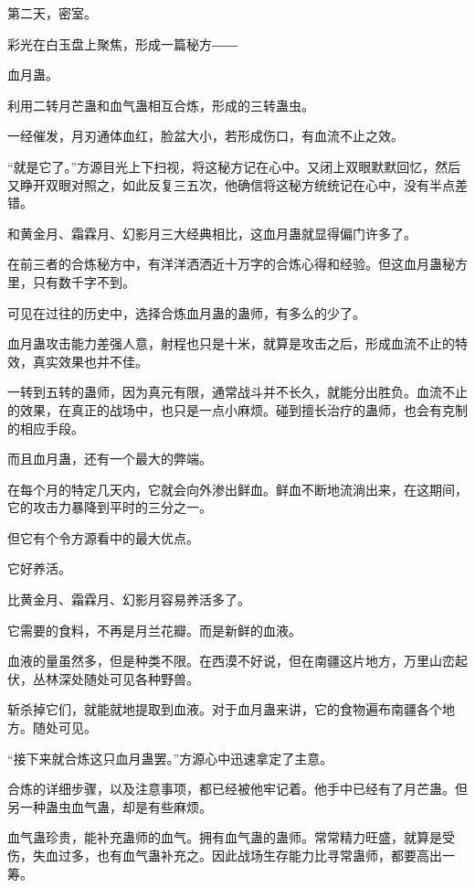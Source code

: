 
\begin{this_body}

第二天，密室。

彩光在白玉盘上聚焦，形成一篇秘方――

血月蛊。

利用二转月芒蛊和血气蛊相互合炼，形成的三转蛊虫。

一经催发，月刃通体血红，脸盆大小，若形成伤口，有血流不止之效。

“就是它了。”方源目光上下扫视，将这秘方记在心中。又闭上双眼默默回忆，然后又睁开双眼对照之，如此反复三五次，他确信将这秘方统统记在心中，没有半点差错。

和黄金月、霜霖月、幻影月三大经典相比，这血月蛊就显得偏门许多了。

在前三者的合炼秘方中，有洋洋洒洒近十万字的合炼心得和经验。但这血月蛊秘方里，只有数千字不到。

可见在过往的历史中，选择合炼血月蛊的蛊师，有多么的少了。

血月蛊攻击能力差强人意，射程也只是十米，就算是攻击之后，形成血流不止的特效，真实效果也并不佳。

一转到五转的蛊师，因为真元有限，通常战斗并不长久，就能分出胜负。血流不止的效果，在真正的战场中，也只是一点小麻烦。碰到擅长治疗的蛊师，也会有克制的相应手段。

而且血月蛊，还有一个最大的弊端。

在每个月的特定几天内，它就会向外渗出鲜血。鲜血不断地流淌出来，在这期间，它的攻击力暴降到平时的三分之一。

但它有个令方源看中的最大优点。

它好养活。

比黄金月、霜霖月、幻影月容易养活多了。

它需要的食料，不再是月兰花瓣。而是新鲜的血液。

血液的量虽然多，但是种类不限。在西漠不好说，但在南疆这片地方，万里山峦起伏，丛林深处随处可见各种野兽。

斩杀掉它们，就能就地提取到血液。对于血月蛊来讲，它的食物遍布南疆各个地方。随处可见。

“接下来就合炼这只血月蛊罢。”方源心中迅速拿定了主意。

合炼的详细步骤，以及注意事项，都已经被他牢记着。他手中已经有了月芒蛊。但另一种蛊虫血气蛊，却是有些麻烦。

血气蛊珍贵，能补充蛊师的血气。拥有血气蛊的蛊师。常常精力旺盛，就算是受伤，失血过多，也有血气蛊补充之。因此战场生存能力比寻常蛊师，都要高出一筹。


\end{this_body}
